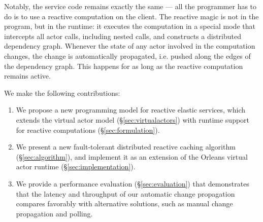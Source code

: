 Notably, the service code remains exactly the same ---  all the programmer has to do is to use a reactive computation on the client.  The reactive magic is not in the program, but in the runtime: it executes the computation in a special mode that intercepts all actor calls, including nested calls, and constructs a distributed dependency graph. Whenever the state of any actor involved in the computation changes, the change is automatically propagated, i.e. pushed along the edges of the dependency graph. This happens for as long as the reactive computation remains active. 


 We make the following contributions:
\begin{enumerate}
\item We propose a new programming model for reactive elastic services, which extends the virtual actor model (\S\ref{sec:virtualactors}) with runtime support for reactive computations (\S\ref{sec:formulation}). 
\item We present a new fault-tolerant distributed reactive caching algorithm (\S\ref{sec:algorithm}), and implement it as an extension of the Orleans virtual actor runtime (\S\ref{sec:implementation}).
\item We provide a performance evaluation (\S\ref{sec:evaluation}) that demonstrates that the latency and throughput of our automatic change propagation compares favorably with alternative solutions, such as manual change propagation and polling.
\end{enumerate}    
   
